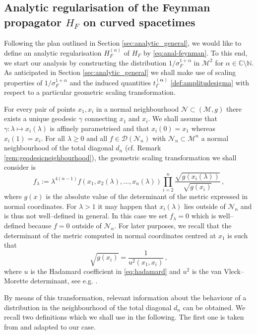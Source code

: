 \documentclass[a4paper,10pt,twoside]{article}
\numberwithin{equation}{section}
\newcounter{and}
\def\M{\mathcal{M}}
\def\N{\mathcal{N}}
\def\D{\mathcal{D}}
\def\balpha{{\boldsymbol{\alpha}}}
\theoremstyle{plain}
\theoremstyle{definition}
\begin{document}




\subsection{Analytic regularisation of the Feynman propagator \texorpdfstring{$H_F$}{HF} on curved spacetimes}
\label{sec:analyticFeynman}

Following the plan outlined in Section \ref{sec:analytic_general}, we would like to define an analytic regularisation $H^{(\alpha)}_F$ of $H_F$ by \eqref{eq:anal-feynman}. To this end, we start our analysis by constructing the distribution $1/\sigma_F^{1+\alpha}$ in $\M^2$ for $\alpha\in \mathbb{C} \setminus \mathbb{N}$. As anticipated in Section \ref{sec:analytic_general} we shall make use of scaling properties of $1/\sigma_F^{1+\alpha}$ and the induced quantities $t^{(\balpha)}_\Gamma$ \eqref{def:amplitudesigma} with respect to a particular geometric scaling transformation. 

For every pair of points $x_1,x_i$ in a normal neighbourhood $\N\subset (\M,g)$ there exists a unique geodesic $\gamma$ connecting $x_1$ and $x_i$. We shall assume that $\gamma:\lambda \mapsto x_i(\lambda)$ is affinely parametrised and that $x_i(0) =x_1$ whereas $x_i(1) = x_i$. 
For all $\lambda\ge0$ and all $f\in \D(\N_n)$ with $\N_n\subset \M^n$ a normal neighbourhood of the total diagonal $d_n$ (cf. Remark \ref{rem:geodesicneighbourhood}), the geometric scaling transformation we shall consider is
\begin{equation}\label{eq:n-dim-scaling}
f_\lambda := \lambda^{4(n-1)}f(x_1,x_2(\lambda ), \dots, x_n(\lambda))  \prod_{i=2}^n\frac{\sqrt{g(x_i(\lambda ))}}{\sqrt{g(x_i)}}\,,
\end{equation}
where $g(x)$ is the absolute value of the determinant of the metric expressed in normal coordinates. For $\lambda>1$ it may happen that $x_i(\lambda)$ lies outside of $\N_n$ and is thus not well--defined in general. In this case we set $f_\lambda=0$ which is well--defined because $f=0$ outside of $\N_n$. For later purposes, we recall that the determinant of the metric computed in normal coordinates centred at $x_1$ is such that 
\[
\sqrt{g(x_i)} = \frac{1}{u^2(x_1,x_i)}\,,
\]
where $u$ is the Hadamard coefficient in \eqref{eq:hadamard} and $u^2$ is the van Vleck--Morette determinant, see e.g.  \cite[(8.5)]{Poisson:2011nh}.

By means of this transformation, relevant information about the behaviour of a distribution in the neighbourhood of the total diagonal $d_n$ can be obtained. We recall two definitions which we shall use in the following. The first one is taken from \cite{Brunetti-Fredenhagen:2000} and adapted to our case.
\end{document}

